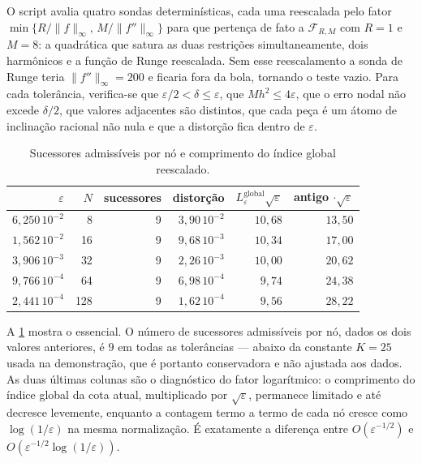 O script avalia quatro sondas determinísticas, cada uma reescalada pelo fator
$\min\{R/\|f\|_\infty,\,M/\|f''\|_\infty\}$ para que pertença de fato a
$\mathcal F_{R,M}$ com $R=1$ e $M=8$: a quadrática que satura as duas
restrições simultaneamente, dois harmônicos e a função de Runge reescalada.
Sem esse reescalamento a sonda de Runge teria $\|f''\|_\infty=200$ e ficaria
fora da bola, tornando o teste vazio. Para cada tolerância, verifica-se que
$\varepsilon/2<\delta\le\varepsilon$, que $Mh^2\le4\varepsilon$, que o erro
nodal não excede $\delta/2$, que valores adjacentes são distintos, que cada
peça é um átomo de inclinação racional não nula e que a distorção fica dentro
de $\varepsilon$.

\begin{table}[t]
\centering
\caption{Sucessores admissíveis por nó e comprimento do índice global reescalado.}
\label{tab:codebook-pt}
\small
\begin{tabular}{rrrrrr}
\toprule
$\varepsilon$ & $N$ & sucessores & distorção & $L_\varepsilon^{\mathrm{global}}\sqrt{\varepsilon}$ & antigo $\cdot\sqrt{\varepsilon}$\\
\midrule
$6{,}250\,10^{-2}$ & 8   & 9 & $3{,}90\,10^{-2}$ & $10{,}68$ & $13{,}50$\\
$1{,}562\,10^{-2}$ & 16  & 9 & $9{,}68\,10^{-3}$ & $10{,}34$ & $17{,}00$\\
$3{,}906\,10^{-3}$ & 32  & 9 & $2{,}26\,10^{-3}$ & $10{,}00$ & $20{,}62$\\
$9{,}766\,10^{-4}$ & 64  & 9 & $6{,}98\,10^{-4}$ & $9{,}74$  & $24{,}38$\\
$2{,}441\,10^{-4}$ & 128 & 9 & $1{,}62\,10^{-4}$ & $9{,}56$  & $28{,}22$\\
\bottomrule
\end{tabular}
\end{table}

A \cref{tab:codebook-pt} mostra o essencial. O número de sucessores
admissíveis por nó, dados os dois valores anteriores, é $9$ em todas as
tolerâncias --- abaixo da constante $K=25$ usada na demonstração, que é
portanto conservadora e não ajustada aos dados. As duas últimas colunas são o
diagnóstico do fator logarítmico: o comprimento do índice global da cota atual,
multiplicado por $\sqrt{\varepsilon}$, permanece limitado e até decresce
levemente, enquanto a contagem termo a termo de cada nó cresce
como $\log(1/\varepsilon)$ na mesma normalização. É exatamente a diferença
entre $O(\varepsilon^{-1/2})$ e $O(\varepsilon^{-1/2}\log(1/\varepsilon))$.

